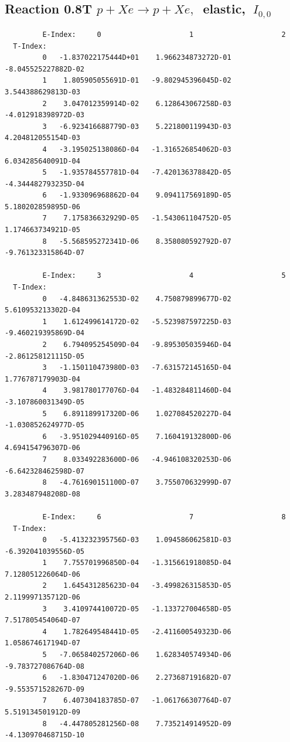 \documentclass[12pt,dvips]{article}
\begin{document}
\subsection{
Reaction 0.8T  $p + Xe \rightarrow p + Xe ,\ $
 elastic, $\  I_{0,0}$
}

\begin{small}\begin{verbatim}
         E-Index:     0                     1                     2
  T-Index:
         0   -1.837022175444D+01    1.966234873272D-01   -8.045525227882D-02
         1    1.805905055691D-01   -9.802945396045D-02    3.544388629813D-03
         2    3.047012359914D-02    6.128643067258D-03   -4.012918398972D-03
         3   -6.923416688779D-03    5.221800119943D-03    4.204812055154D-03
         4   -3.195025138086D-04   -1.316526854062D-03    6.034285640091D-04
         5   -1.935784557781D-04   -7.420136378842D-05   -4.344482793235D-04
         6   -1.933096968862D-04    9.094117569189D-05    5.180202859895D-06
         7    7.175836632929D-05   -1.543061104752D-05    1.174663734921D-05
         8   -5.568595272341D-06    8.358080592792D-07   -9.761323315864D-07

         E-Index:     3                     4                     5
  T-Index:
         0   -4.848631362553D-02    4.750879899677D-02    5.610953213302D-04
         1    1.612499614172D-02   -5.523987597225D-03   -9.460219395869D-04
         2    6.794095254509D-04   -9.895305035946D-04   -2.861258121115D-05
         3   -1.150110473980D-03   -7.631572145165D-04    1.776787179903D-04
         4    3.981780177076D-04   -1.483284811460D-04   -3.107860031349D-05
         5    6.891189917320D-06    1.027084520227D-04   -1.030852624977D-05
         6   -3.951029440916D-05    7.160419132800D-06    4.694154796307D-06
         7    8.033492283600D-06   -4.946108320253D-06   -6.642328462598D-07
         8   -4.761690151100D-07    3.755070632999D-07    3.283487948208D-08

         E-Index:     6                     7                     8
  T-Index:
         0   -5.413232395756D-03    1.094586062581D-03   -6.392041039556D-05
         1    7.755701996850D-04   -1.315661918085D-04    7.128051226064D-06
         2    1.645431285623D-04   -3.499826315853D-05    2.119997135712D-06
         3    3.410974410072D-05   -1.133727004658D-05    7.517805454064D-07
         4    1.782649548441D-05   -2.411600549323D-06    1.058674617194D-07
         5   -7.065840257206D-06    1.628340574934D-06   -9.783727086764D-08
         6   -1.830471247020D-06    2.273687191682D-07   -9.553571528267D-09
         7    6.407304183785D-07   -1.061766307764D-07    5.519134501912D-09
         8   -4.447805281256D-08    7.735214914952D-09   -4.130970468715D-10
\end{verbatim}\end{small}
\end{document}
